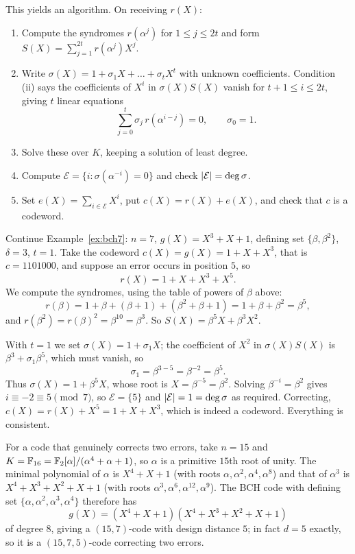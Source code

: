 \documentclass[a4paper]{scrartcl}
\newcommand{\Ec}{\mathcal{E}}
\begin{document}
This yields an algorithm. On receiving $r(X)$:
\begin{enumerate}[label=(\arabic*)]
	\item Compute the syndromes $r(\alpha^j)$ for $1 \le j \le 2t$ and form $S(X) = \sum_{j=1}^{2t}r(\alpha^j)X^j$.
	\item Write $\sigma(X) = 1 + \sigma_1X+\dots+\sigma_tX^t$ with unknown coefficients. Condition (ii) says the coefficients of $X^i$ in $\sigma(X)S(X)$ vanish for $t+1\le i\le 2t$, giving $t$ linear equations
	$$\sum_{j=0}^{t}\sigma_j\, r(\alpha^{i-j}) = 0, \qquad \sigma_0 = 1.$$
	\item Solve these over $K$, keeping a solution of least degree.
	\item Compute $\Ec = \{i : \sigma(\alpha^{-i}) = 0\}$ and check $\abs{\Ec} = \deg\sigma$.
	\item Set $e(X) = \sum_{i\in\Ec}X^i$, put $c(X) = r(X)+e(X)$, and check that $c$ is a codeword.
\end{enumerate}

\begin{example}
	Continue Example~\ref{ex:bch7}: $n = 7$, $g(X)=X^3+X+1$, defining set $\{\beta,\beta^2\}$, $\delta = 3$, $t = 1$. Take the codeword $c(X) = g(X) = 1+X+X^3$, that is $c = 1101000$, and suppose an error occurs in position $5$, so
	$$r(X) = 1+X+X^3+X^5.$$
	We compute the syndromes, using the table of powers of $\beta$ above:
	$$r(\beta) = 1+\beta+(\beta+1)+(\beta^2+\beta+1) = 1 + \beta+\beta^2 = \beta^5,$$
	and $r(\beta^2) = r(\beta)^2 = \beta^{10} = \beta^3$. So $S(X) = \beta^5X+\beta^3X^2$.

	With $t=1$ we set $\sigma(X) = 1+\sigma_1X$; the coefficient of $X^2$ in $\sigma(X)S(X)$ is $\beta^3 + \sigma_1\beta^5$, which must vanish, so
	$$\sigma_1 = \beta^{3-5} = \beta^{-2}=\beta^5.$$
	Thus $\sigma(X) = 1+\beta^5X$, whose root is $X = \beta^{-5} = \beta^2$. Solving $\beta^{-i} = \beta^2$ gives $i \equiv -2\equiv 5 \pmod 7$, so $\Ec = \{5\}$ and $\abs{\Ec}=1=\deg\sigma$ as required. Correcting, $c(X) = r(X)+X^5 = 1+X+X^3$, which is indeed a codeword. Everything is consistent.
\end{example}

\begin{example}
	For a code that genuinely corrects two errors, take $n = 15$ and $K = \mathbb{F}_{16} = \mathbb{F}_2[\alpha]/(\alpha^4+\alpha+1)$, so $\alpha$ is a primitive $15$th root of unity. The minimal polynomial of $\alpha$ is $X^4+X+1$ (with roots $\alpha,\alpha^2,\alpha^4,\alpha^8$) and that of $\alpha^3$ is $X^4+X^3+X^2+X+1$ (with roots $\alpha^3,\alpha^6,\alpha^{12},\alpha^9$). The BCH code with defining set $\{\alpha,\alpha^2,\alpha^3,\alpha^4\}$ therefore has
	$$g(X) = (X^4+X+1)(X^4+X^3+X^2+X+1)$$
	of degree $8$, giving a $(15,7)$-code with design distance $5$; in fact $d = 5$ exactly, so it is a $(15,7,5)$-code correcting two errors.
\end{example}
\end{document}
